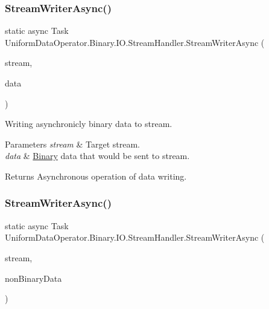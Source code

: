 \subsubsection{\texorpdfstring{Stream\+Writer\+Async()}{StreamWriterAsync()}\hspace{0.1cm}{\footnotesize\ttfamily [1/4]}}
{\footnotesize\ttfamily static async Task Uniform\+Data\+Operator.\+Binary.\+I\+O.\+Stream\+Handler.\+Stream\+Writer\+Async (\begin{DoxyParamCaption}\item[{Pipe\+Stream}]{stream,  }\item[{byte \mbox{[}$\,$\mbox{]}}]{data }\end{DoxyParamCaption})\hspace{0.3cm}{\ttfamily [static]}}



Writing asynchronicly binary data to stream. 


\begin{DoxyParams}{Parameters}
{\em stream} & Target stream.\\
\hline
{\em data} & \mbox{\hyperlink{namespace_uniform_data_operator_1_1_binary}{Binary}} data that would be sent to stream.\\
\hline
\end{DoxyParams}
\begin{DoxyReturn}{Returns}
Asynchronous operation of data writing.
\end{DoxyReturn}
\mbox{\label{class_uniform_data_operator_1_1_binary_1_1_i_o_1_1_stream_handler_a18b5d8b3ab9402ea3b112c7e7bd830be}} 
\subsubsection{\texorpdfstring{Stream\+Writer\+Async()}{StreamWriterAsync()}\hspace{0.1cm}{\footnotesize\ttfamily [2/4]}}
{\footnotesize\ttfamily static async Task Uniform\+Data\+Operator.\+Binary.\+I\+O.\+Stream\+Handler.\+Stream\+Writer\+Async (\begin{DoxyParamCaption}\item[{Pipe\+Stream}]{stream,  }\item[{object}]{non\+Binary\+Data }\end{DoxyParamCaption})\hspace{0.3cm}{\ttfamily [static]}}



